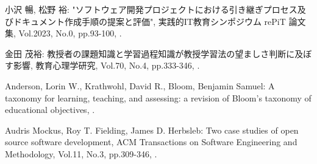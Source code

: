 \documentclass[a4paper,9pt, twocolumn]{jarticle}
\begin{document}
%
%
\begin{thebibliography}{9}
	\itemsep -1.7pt

	{\small 小沢 暢, 松野 裕:
	\newblock "ソフトウェア開発プロジェクトにおける引き継ぎプロセス及びドキュメント作成手順の提案と評価",
	\newblock 実践的IT教育シンポジウム rePiT 論文集,
	\newblock Vol.2023,
	\newblock No.0,
	\newblock pp.93-100,
	.}

	{\small 金田 茂裕:
		\newblock 教授者の課題知識と学習過程知識が教授学習法の望ましさ判断に及ぼす影響,
		\newblock 教育心理学研究,
		\newblock Vol.70,
		\newblock No.4,
		\newblock pp.333-346,
		.}

	{\small Anderson, Lorin W., Krathwohl, David R., Bloom, Benjamin Samuel:
		\newblock A taxonomy for learning, teaching, and assessing: a revision of Bloom's taxonomy of educational objectives,
		.}

	{\small Audris Mockus, Roy T. Fielding, James D. Herbsleb:
		\newblock Two case studies of open source software development,
		\newblock ACM Transactions on Software Engineering and Methodology,
		\newblock Vol.11,
		\newblock No.3,
		\newblock pp.309-346,
		.}


\end{thebibliography}
\end{document}
